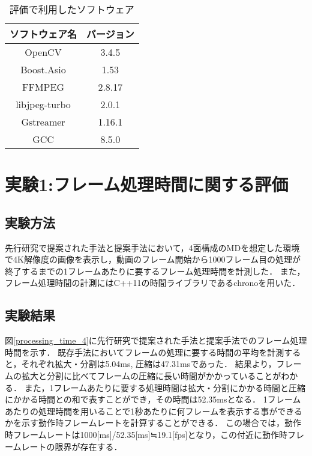 \begin{table}[H]
    \caption{評価で利用したソフトウェア}
    \begin{center}
    \begin{tabular}{cc}
    \hline
    ソフトウェア名 & バージョン \\\hline\hline
    OpenCV & 3.4.5 \\ \hline
    Boost.Asio  & 1.53  \\ \hline
    FFMPEG & 2.8.17 \\ \hline
    libjpeg-turbo & 2.0.1 \\ \hline
    Gstreamer & 1.16.1 \\ \hline
    GCC & 8.5.0 \\ \hline
    \end{tabular}
    \label{software_version}
    \end{center}
\end{table}


\section{実験1:フレーム処理時間に関する評価}

\subsection*{実験方法}
先行研究で提案された手法と提案手法において，4面構成のMDを想定した環境で4K解像度の画像を表示し，動画のフレーム開始から1000フレーム目の処理が終了するまでの1フレームあたりに要するフレーム処理時間を計測した．
また，フレーム処理時間の計測にはC++11の時間ライブラリであるchronoを用いた．

\subsection*{実験結果}
図\ref{processing_time_4}に先行研究で提案された手法と提案手法でのフレーム処理時間を示す．
既存手法においてフレームの処理に要する時間の平均を計測すると，それぞれ拡大・分割は5.04ms, 圧縮は47.31msであった．
結果より，フレームの拡大と分割に比べてフレームの圧縮に長い時間がかかっていることがわかる．
また，1フレームあたりに要する処理時間は拡大・分割にかかる時間と圧縮にかかる時間との和で表すことができ，その時間は52.35msとなる．
1フレームあたりの処理時間を用いることで1秒あたりに何フレームを表示する事ができるかを示す動作時フレームレートを計算することができる．
この場合では，動作時フレームレートは1000[ms]/52.35[ms]≒19.1[fps]となり，この付近に動作時フレームレートの限界が存在する．

